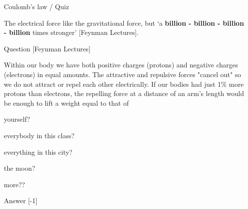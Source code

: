 {
\problemslide

%
%
%

\begin{frame}{Coulomb's law / Quiz}

The electrical force like the gravitational force, but `a {\bf billion - billion - billion - billion} times stronger' [Feynman Lectures].

\begin{blockexmplque}{\small Question [Feynman Lectures]}
{\scriptsize
  Within our body we have both positive charges (protons) and negative charges (electrons) in equal amounts.
  The attractive and repulsive forces "cancel out" so we do not attract or repel each other electrically.
  If our bodies had just 1\% more protons than electrons,
  the repelling force at a distance of an arm's length would be enough to lift a weight equal to that of
  \begin{itemize}
  {\scriptsize
    \item yourself?
    \item everybody in this class?
    \item everything in this city?
    \item the moon?
    \item more??
  }
  \end{itemize}
}
\end{blockexmplque}

\begin{blockexmplans}{\small Answer}
\noindent
\scalebox{1}[-1]{
}
\end{blockexmplans}

\end{frame}

}

%
%
%

